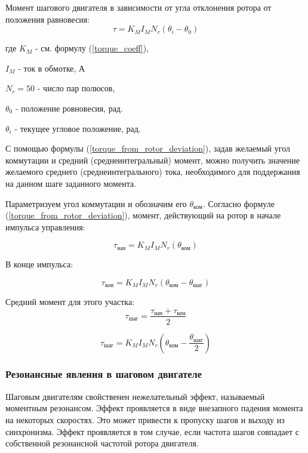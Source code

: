 Момент шагового двигателя в зависимости от угла отклонения ротора от положения равновесия:
\begin{equation}
    \label{torque_from_rotor_deviation}
    \tau = K_{M} I_{M} N_{r} ( \theta_{i} - \theta_{0} )
\end{equation}

где $K_{M}$ - см. формулу (\ref{torque_coeff}),

$I_{M}$ - ток в обмотке, А

$N_{r} = 50$ - число пар полюсов,

$\theta_{0}$ - положение ровновесия, рад.

$\theta_{i}$ - текущее угловое положение, рад.

С помощью формулы (\ref{torque_from_rotor_deviation}), задав желаемый угол коммутации и
средний (среднеинтегральный) момент, можно получить значение желаемого среднего
(среднеинтегрального) тока, необходимого для поддержания на данном шаге заданного момента.

Параметризуем угол коммутации и обозначим его $\theta_{\textit{ком}}$.
Согласно формуле (\ref{torque_from_rotor_deviation}), момент, действующий на ротор
в начале импульса управления:

\begin{equation}
    \label{moment_to_rotor_at_the_begin_of_control_pulse}
    \tau_{\textit{нач}} = K_{M} I_{M} N_{r} ( \theta_{\textit{ком}} )
\end{equation}

В конце импульса:

\begin{equation}
    \label{moment_to_rotor_at_the_end_of_control_pulse}
    \tau_{\textit{кон}} = K_{M} I_{M} N_{r} ( \theta_{\textit{ком}} - \theta_{\textit{шаг}} )
\end{equation}

Средний момент для этого участка:
$$
    \tau_{\textit{шаг}} = \frac{ \tau_{\textit{нач}} + \tau_{\textit{кон}} }{ 2 }
$$

\begin{equation}
    \label{eq_average_moment_to_rotor_on_control_pulse}
    \tau_{\textit{шаг}} = K_{M} I_{M} N_{r} ( \theta_{\textit{ком}} - \frac{ \theta_{\textit{шаг}} }{ 2 } )
\end{equation}

\subsubsection{Резонансные явления в шаговом двигателе}
Шаговым двигателям свойственен нежелательный эффект, называемый моментным резонансом. Эффект
проявляется в виде внезапного падения момента на некоторых скоростях. Это может привести к пропуску
шагов и выходу из синхронизма. Эффект проявляется в том случае, если частота шагов совпадает с
собственной резонансной частотой ротора двигателя.

